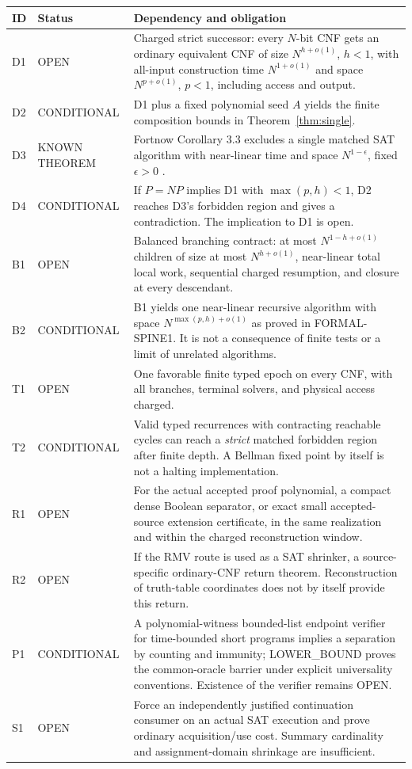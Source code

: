 \documentclass[11pt]{article}
\begin{document}
{\small
\begin{longtable}{p{}p{}p{}}
\toprule
ID & Status & Dependency and obligation\\\midrule\endhead
D1 & OPEN & Charged strict successor: every $N$-bit CNF gets an ordinary
equivalent CNF of size $N^{h+o(1)}$, $h<1$, with all-input construction
time $N^{1+o(1)}$ and space $N^{p+o(1)}$, $p<1$, including access and output.\\
D2 & CONDITIONAL & D1 plus a fixed polynomial seed $A$ yields the finite
composition bounds in Theorem~\ref{thm:single}.\\
D3 & KNOWN THEOREM & Fortnow Corollary 3.3 excludes a single matched SAT
algorithm with near-linear time and space $N^{1-\epsilon}$, fixed
$\epsilon>0$ \cite{fortnow}.\\
D4 & CONDITIONAL & If $P=NP$ implies D1 with $\max(p,h)<1$, D2 reaches D3's
forbidden region and gives a contradiction. The implication to D1 is open.\\
B1 & OPEN & Balanced branching contract: at most $N^{1-h+o(1)}$ children of
size at most $N^{h+o(1)}$, near-linear total local work, sequential charged
resumption, and closure at every descendant.\\
B2 & CONDITIONAL & B1 yields one near-linear recursive algorithm with space
$N^{\max(p,h)+o(1)}$ as proved in FORMAL-SPINE1. It is not a consequence
of finite tests or a limit of unrelated algorithms.\\
T1 & OPEN & One favorable finite typed epoch on every CNF, with all branches,
terminal solvers, and physical access charged.\\
T2 & CONDITIONAL & Valid typed recurrences with contracting reachable cycles
can reach a \emph{strict} matched forbidden region after finite depth. A
Bellman fixed point by itself is not a halting implementation.\\
R1 & OPEN & For the actual accepted proof polynomial, a compact dense Boolean
separator, or exact small accepted-source extension certificate, in the
same realization and within the charged reconstruction window.\\
R2 & OPEN & If the RMV route is used as a SAT shrinker, a source-specific
ordinary-CNF return theorem. Reconstruction of truth-table coordinates does
not by itself provide this return.\\
P1 & CONDITIONAL & A polynomial-witness bounded-list endpoint verifier for
time-bounded short programs implies a separation by counting and immunity;
LOWER\_BOUND proves the common-oracle barrier under explicit universality
conventions. Existence of the verifier remains OPEN.\\
S1 & OPEN & Force an independently justified continuation consumer on an
actual SAT execution and prove ordinary acquisition/use cost. Summary
cardinality and assignment-domain shrinkage are insufficient.\\
\bottomrule
\end{longtable}}
\end{document}
